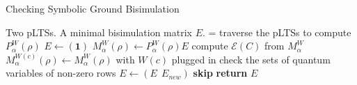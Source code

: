\documentclass[runningheads]{llncs}
\begin{document}



\begin{algorithm}[htbp]
\caption{Checking Symbolic Ground Bisimulation}
\label{alg:bisim}
\begin{algorithmic}[1]
\Require Two pLTSs.
\Ensure A minimal bisimulation matrix $E$.
 = 
\State traverse the pLTSs to compute $P^{W}_{\alpha}(\rho)$
\EndFor
\State $E\leftarrow(\textbf{1})$
\Repeat
{}
\State $M^{W}_{\alpha}(\rho)\leftarrow P^{W}_{\alpha}(\rho)E$
\State compute $\mathcal{E}(C)$ from $M^{W}_{\alpha}$
\State $M^{W(c)}_{\alpha}(\rho)\leftarrow M^{W}_{\alpha}(\rho)$ with $W(c)$ plugged in
\State check the sets of quantum variables of non-zero rows
\State $E\leftarrow(E ~~ E_{new})$
\Else \textbf{ skip }
\EndIf
\EndFor
\EndFor
\EndFor
{}
\State \textbf{return} $E$
\EndFunction
\end{algorithmic}
\end{algorithm}
\end{document}
